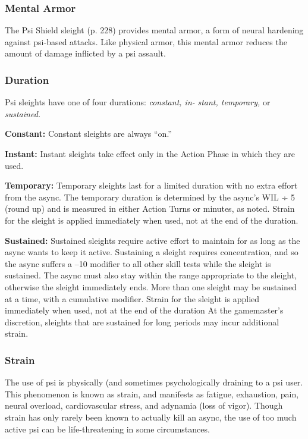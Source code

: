 \subsubsection{Mental Armor}

The Psi Shield sleight (p. 228) provides mental armor, 
a form of neural hardening against psi-based attacks. 
Like physical armor, this mental armor reduces the 
amount of damage inflicted by a psi assault.

\subsubsection{Duration}

Psi sleights have one of four durations: \textit{constant, in-}
\textit{stant, temporary,} or \textit{sustained.}

\textbf{Constant:} Constant sleights are always ``on.''

\textbf{Instant:} Instant sleights take effect only in the 
Action Phase in which they are used.

\textbf{Temporary:} Temporary sleights last for a limited 
duration with no extra effort from the async. The 
temporary duration is determined by the async's WIL 
÷ 5 (round up) and is measured in either Action Turns 
or minutes, as noted. Strain for the sleight is applied 
immediately when used, not at the end of the duration.

\textbf{Sustained:} Sustained sleights require active effort 
to maintain for as long as the async wants to keep 
it active. Sustaining a sleight requires concentration, 
and so the async suffers a –10 modifier to all other 
skill tests while the sleight is sustained. The async 
must also stay within the range appropriate to the 
sleight, otherwise the sleight immediately ends. More 
than one sleight may be sustained at a time, with a 
cumulative modifier. Strain for the sleight is applied 
immediately when used, not at the end of the duration
At the gamemaster's discretion, sleights that are
sustained for long periods may incur additional strain.

\subsubsection{Strain}

The use of psi is physically (and sometimes psychologically
draining to a psi user. This phenomenon is
known as strain, and manifests as fatigue, exhaustion, 
pain, neural overload, cardiovascular stress, and 
adynamia (loss of vigor). Though strain has only 
rarely been known to actually kill an async, the use 
of too much active psi can be life-threatening in some 
circumstances.

